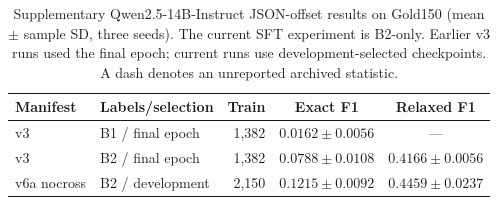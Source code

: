 \begin{table}[htbp]
\caption{Supplementary Qwen2.5-14B-Instruct JSON-offset results on Gold150 (mean $\pm$ sample SD, three seeds). The current SFT experiment is B2-only. Earlier v3 runs used the final epoch; current runs use development-selected checkpoints. A dash denotes an unreported archived statistic.}
\label{tab:qwen-supplement}
\centering
\small
\begin{tabular}{@{}llrcc@{}}
\toprule
Manifest & Labels/selection & Train & Exact F1 & Relaxed F1 \\
\midrule
v3 & B1 / final epoch & 1,382 & $0.0162\pm0.0056$ & --- \\
v3 & B2 / final epoch & 1,382 & $0.0788\pm0.0108$ & $0.4166\pm0.0056$ \\
v6a nocross & B2 / development & 2,150 & $0.1215\pm0.0092$ & $0.4459\pm0.0237$ \\
\bottomrule
\end{tabular}
\end{table}
